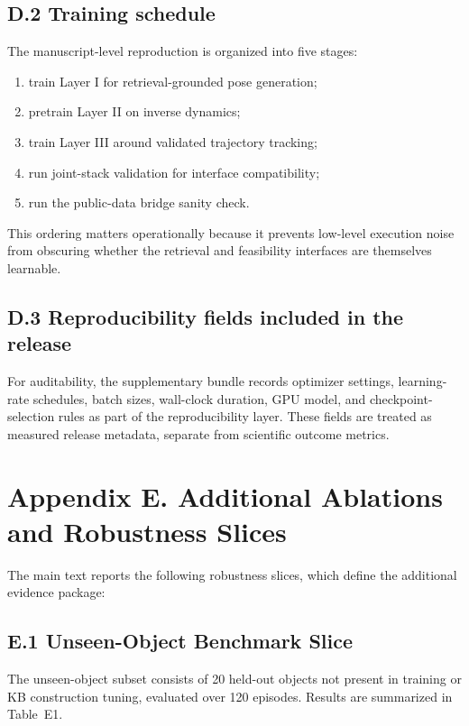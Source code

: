 \documentclass[11pt]{article}
\begin{document}
\subsection{D.2 Training schedule}

The manuscript-level reproduction is organized into five stages:

\begin{enumerate}[leftmargin=1.5em]
\item train Layer I for retrieval-grounded pose generation;
\item pretrain Layer II on inverse dynamics;
\item train Layer III around validated trajectory tracking;
\item run joint-stack validation for interface compatibility;
\item run the public-data bridge sanity check.
\end{enumerate}

This ordering matters operationally because it prevents low-level execution noise from obscuring whether the retrieval and feasibility interfaces are themselves learnable.

\subsection{D.3 Reproducibility fields included in the release}

For auditability, the supplementary bundle records optimizer settings, learning-rate schedules, batch sizes, wall-clock duration, GPU model, and checkpoint-selection rules as part of the reproducibility layer. These fields are treated as measured release metadata, separate from scientific outcome metrics.

\section{Appendix E. Additional Ablations and Robustness Slices}

The main text reports the following robustness slices, which define the additional evidence package:

\subsection{E.1 Unseen-Object Benchmark Slice}

The unseen-object subset consists of 20 held-out objects not present in training or KB construction tuning, evaluated over 120 episodes. Results are summarized in Table~E1.
\end{document}

